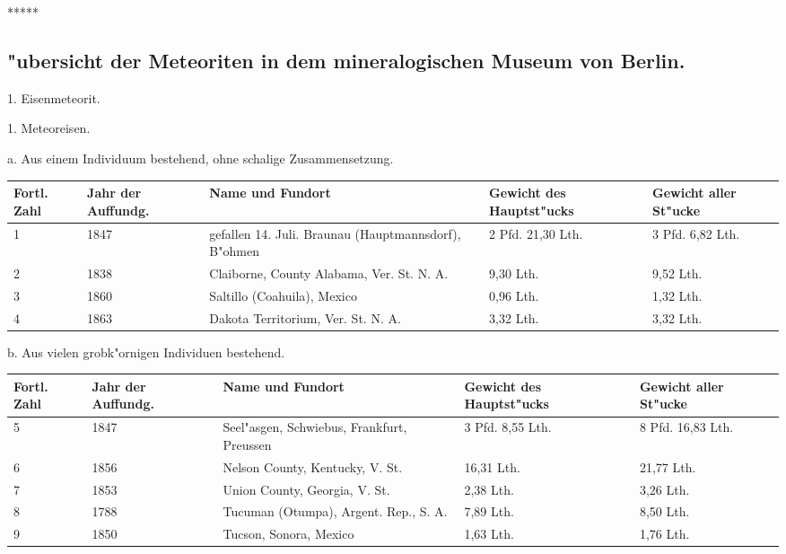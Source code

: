 \documentclass[a4paper, 11pt, oneside, german]{article}
\begin{document}
\centerline{*\hspace{15mm}*\hspace{15mm}*\hspace{15mm}*\hspace{15mm}*}
\clearpage
\subsection{"ubersicht der Meteoriten in dem mineralogischen Museum von Berlin.}
\begin{center}
1. Eisenmeteorit.
\end{center}
\begin{center}
1. Meteoreisen.
\end{center}
\begin{center}
a. Aus einem Individuum bestehend, ohne schalige Zusammensetzung.
\end{center}
\begin{center}
\begin{footnotesize}
\begin{tabular}{ |p{7mm}|p{9mm}|p{45mm}|p{23mm}|p{20mm}| }
    \hline
    Fortl. Zahl & Jahr der Auffundg. & Name und Fundort & Gewicht des Hauptst"ucks & Gewicht aller St"ucke\\
    \hline\hline
    1 & 1847 & gefallen 14. Juli. Braunau (Hauptmannsdorf), B"ohmen & 2 Pfd. 21,30 Lth. & 3 Pfd. 6,82 Lth.\\\hline
    2 & 1838 & Claiborne, County Alabama, Ver. St. N. A. & 9,30 Lth. & 9,52 Lth.\\\hline
    3 & 1860 & Saltillo (Coahuila), Mexico & 0,96 Lth. & 1,32 Lth.\\\hline
    4 & 1863 & Dakota Territorium, Ver. St. N. A. & 3,32 Lth. & 3,32 Lth.\\
    \hline
\end{tabular}
\end{footnotesize}
\end{center}
\begin{center}
b. Aus vielen grobk"ornigen Individuen bestehend.
\end{center}
\begin{center}
\begin{footnotesize}
\begin{tabular}{ |p{7mm}|p{9mm}|p{45mm}|p{20mm}|p{23mm}| }
    \hline
    Fortl. Zahl & Jahr der Auffundg. & Name und Fundort & Gewicht des Hauptst"ucks & Gewicht aller St"ucke\\
    \hline\hline
    5 & 1847 & Seel"asgen, Schwiebus, Frankfurt, Preussen & 3 Pfd. 8,55 Lth. & 8 Pfd. 16,83 Lth.\\\hline
    6 & 1856 & Nelson County, Kentucky, V. St. & 16,31 Lth. & 21,77 Lth.\\\hline
    7 & 1853 & Union County, Georgia, V. St. & 2,38 Lth. & 3,26 Lth.\\\hline
    8 & 1788 & Tucuman (Otumpa), Argent. Rep., S. A. & 7,89 Lth. & 8,50 Lth.\\\hline
    9 & 1850 & Tucson, Sonora, Mexico & 1,63 Lth. & 1,76 Lth.\\
    \hline
\end{tabular}
\end{footnotesize}
\end{center}
\end{document}
